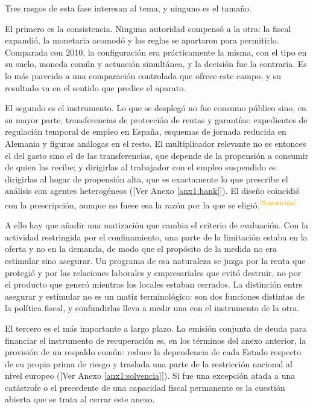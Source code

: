 \documentclass[10pt,a4paper]{article}
\newcommand{\authorfont}[1]{{\fontfamily{EBGaramond-TLF}\selectfont #1}}
\newcounter{anexo}
\begin{document}
Tres rasgos de esta fase interesan al tema, y ninguno es el tamaño.

El primero es la consistencia. Ninguna autoridad compensó a la otra: la fiscal expandió, la monetaria acomodó y las reglas se apartaron para permitirlo. Comparada con $2010$, la configuración era prácticamente la misma, con el tipo en su suelo, moneda común y actuación simultánea, y la decisión fue la contraria. Es lo más parecido a una comparación controlada que ofrece este campo, y su resultado va en el sentido que predice el aparato.

El segundo es el instrumento. Lo que se desplegó no fue consumo público sino, en su mayor parte, transferencias de protección de rentas y garantías: expedientes de regulación temporal de empleo en España, esquemas de jornada reducida en Alemania y figuras análogas en el resto. El multiplicador relevante no es entonces el del gasto sino el de las transferencias, que depende de la propensión a consumir de quien las recibe; y dirigirlas al trabajador con el empleo suspendido es dirigirlas al hogar de propensión alta, que es exactamente lo que prescribe el análisis con agentes heterogéneos ([\authorfont{Ver Anexo \ref{anx1:hank}}]). El diseño coincidió con la prescripción, aunque no fuese esa la razón por la que se eligió.\textcolor{orange}{\textsuperscript{[Suposición]}}

A ello hay que añadir una matización que cambia el criterio de evaluación. Con la actividad restringida por el confinamiento, una parte de la limitación estaba en la oferta y no en la demanda, de modo que el propósito de la medida no era estimular sino asegurar. Un programa de esa naturaleza se juzga por la renta que protegió y por las relaciones laborales y empresariales que evitó destruir, no por el producto que generó mientras los locales estaban cerrados. La distinción entre asegurar y estimular no es un matiz terminológico: son dos funciones distintas de la política fiscal, y confundirlas lleva a medir una con el instrumento de la otra.

El tercero es el más importante a largo plazo. La emisión conjunta de deuda para financiar el instrumento de recuperación es, en los términos del anexo anterior, la provisión de un respaldo común: reduce la dependencia de cada Estado respecto de su propia prima de riesgo y traslada una parte de la restricción nacional al nivel europeo ([\authorfont{Ver Anexo \ref{anx1:solvencia}}]). Si fue una excepción atada a una catástrofe o el precedente de una capacidad fiscal permanente es la cuestión abierta que se trata al cerrar este anexo.
\end{document}
